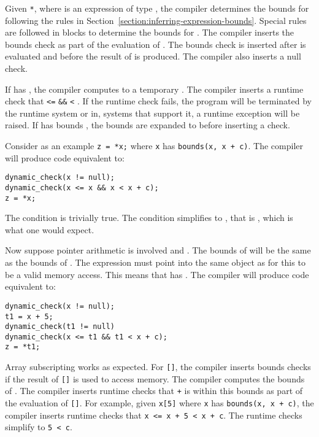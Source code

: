 Given \lstinline|*|, where  is an expression of type
\arrayptr, the compiler determines the bounds for 
following the rules in Section~\ref{section:inferring-expression-bounds}.
Special rules are followed in
 blocks to determine the bounds for . The
compiler inserts the bounds check as part of the evaluation of .
The bounds check is inserted after  is evaluated and before the result of
 is produced.  The compiler also inserts a null check.

If {} has {}, the compiler
computes  to a temporary .   The compiler inserts a runtime check that
 \lstinline|<=|  \lstinline|&&|
 \lstinline|<| . If the runtime check fails, the program
will be terminated by the runtime system or in, systems that support it,
a runtime exception will be raised.   If {} has bounds {},
the bounds are expanded to  before inserting a check.

Consider as an example \lstinline|z = *x;| where
\lstinline|x| has \lstinline|bounds(x, x + c)|. The compiler will produce code equivalent to:
\begin{lstlisting}
dynamic_check(x != null);
dynamic_check(x <= x && x < x + c);
z = *x;
\end{lstlisting}
The condition  is trivially true. The
condition  simplifies to , that is , which is what one
would expect.

Now suppose pointer arithmetic is involved and . The
bounds of  will be the same as the bounds of .
The expression  must point into the same object as
 for this to be a valid memory access. This means that
{} has {}.
The compiler will produce code equivalent to:

\begin{lstlisting}
dynamic_check(x != null);
t1 = x + 5;
dynamic_check(t1 != null)
dynamic_check(x <= t1 && t1 < x + c);
z = *t1;
\end{lstlisting}

Array subscripting works as expected. For \lstinline|[|\lstinline|]|, the
compiler inserts bounds checks if the result of \lstinline|[|\lstinline|]|
is used to access memory.   The compiler computes the bounds of
. The compiler inserts
runtime checks that  \lstinline|+|  is within this bounds as
part of the evaluation of \lstinline|[|\lstinline|]|. For example,
given \lstinline|x[5]| where \lstinline|x| has \lstinline|bounds(x, x + c)|, the
compiler inserts runtime checks that \lstinline|x <= x + 5 < x + c|.
The runtime checks simplify to \lstinline|5 < c|.

